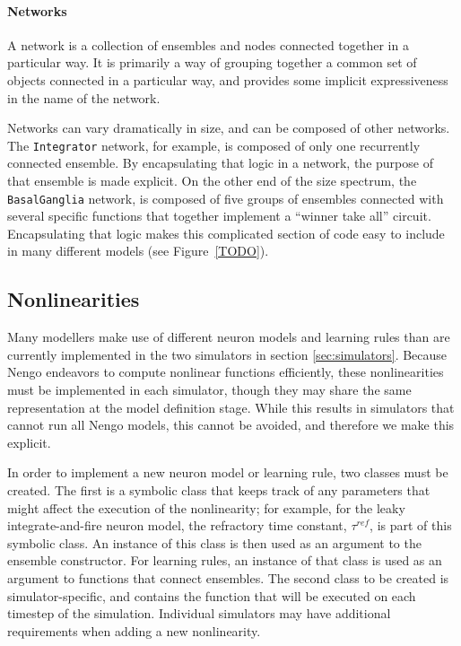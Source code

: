 \documentclass{frontiersSCNS}
\begin{document}
\paragraph{Networks}
A network is a collection of ensembles and nodes
connected together in a particular way.
It is primarily a way of grouping together
a common set of objects connected in a particular way,
and provides some implicit expressiveness
in the name of the network.

Networks can vary dramatically in size,
and can be composed of other networks.
The \texttt{Integrator} network, for example,
is composed of only one recurrently connected ensemble.
By encapsulating that logic in a network,
the purpose of that ensemble is made explicit.
On the other end of the size spectrum,
the \texttt{BasalGanglia} network,
is composed of five groups of ensembles
connected with several specific functions
that together implement a ``winner take all'' circuit.
Encapsulating that logic
makes this complicated section of code
easy to include in many different models
(see Figure~\ref{TODO}).

\subsection{Nonlinearities}

Many modellers make use of
different neuron models and
learning rules than are
currently implemented
in the two simulators
in section \ref{sec:simulators}.
Because Nengo endeavors
to compute nonlinear functions efficiently,
these nonlinearities
must be implemented in each simulator,
though they may share the same representation
at the model definition stage.
While this results in simulators
that cannot run all Nengo models,
this cannot be avoided,
and therefore we make this explicit.

In order to implement
a new neuron model or learning rule,
two classes must be created.
The first is a symbolic class
that keeps track of any parameters
that might affect the execution
of the nonlinearity;
for example, for
the leaky integrate-and-fire neuron model,
the refractory time constant,
$\tau^{ref}$, is part of this symbolic class.
An instance of this class
is then used as an argument
to the ensemble constructor.
For learning rules,
an instance of that class
is used as an argument
to functions that connect ensembles.
The second class to be created
is simulator-specific,
and contains the function that will be
executed on each timestep of the simulation.
Individual simulators may have additional
requirements when adding
a new nonlinearity.
\end{document}

